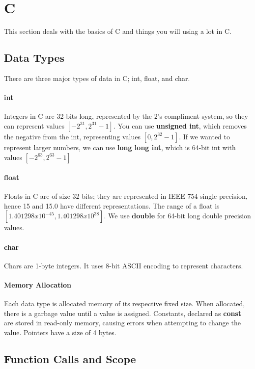 \section{C}
This section deals with the basics of C and things you will using a lot in C.
\subsection{Data Types}
There are three major types of data in C; int, float, and char.
\paragraph{int} Integers in C are 32-bits long, represented by the 2's compliment system, so they can represent values $[-2^{31}, 2^{31} - 1]$. You can use \textbf{unsigned int}, which removes the negative from the int, representing values $[0, 2^{32} - 1]$. If we wanted to represent larger numbers, we can use \textbf{long long int}, which is 64-bit int with values $[-2^{63}, 2^{63} - 1]$
\paragraph{float} Floats in C are of size 32-bits; they are represented in IEEE 754 single precision, hence 15 and 15.0 have different representations. The range of a float is $[1.401298x10^{-45}, 1.401298x10^{38}]$. We use \textbf{double} for 64-bit long double precision values.
\paragraph{char} Chars are 1-byte integers. It uses 8-bit ASCII encoding to represent characters.
\paragraph{Memory Allocation} Each data type is allocated memory of its respective fixed size. When allocated, there is a garbage value until a value is assigned. Constants, declared as \textbf{const} are stored in read-only memory, causing errors when attempting to change the value. Pointers have a size of 4 bytes.
\subsection{Function Calls and Scope}

